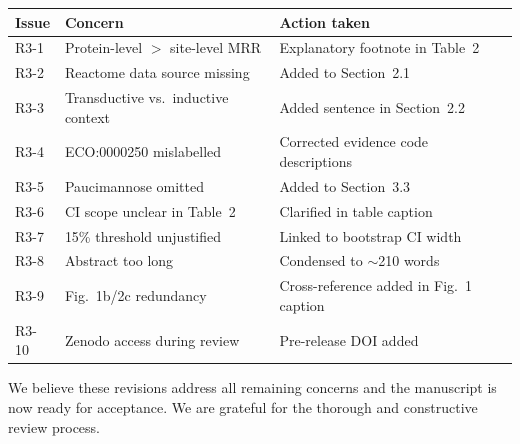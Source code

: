 \documentclass[11pt,a4paper]{article}
\begin{document}
\begin{table}[ht]
\centering
\small
\begin{tabular}{llp{7.5cm}}
\toprule
\textbf{Issue} & \textbf{Concern} & \textbf{Action taken} \\
\midrule
R3-1 & Protein-level $>$ site-level MRR & Explanatory footnote in Table~2 \\
R3-2 & Reactome data source missing & Added to Section~2.1 \\
R3-3 & Transductive vs.\ inductive context & Added sentence in Section~2.2 \\
R3-4 & ECO:0000250 mislabelled & Corrected evidence code descriptions \\
R3-5 & Paucimannose omitted & Added to Section~3.3 \\
R3-6 & CI scope unclear in Table~2 & Clarified in table caption \\
R3-7 & 15\% threshold unjustified & Linked to bootstrap CI width \\
R3-8 & Abstract too long & Condensed to $\sim$210 words \\
R3-9 & Fig.~1b/2c redundancy & Cross-reference added in Fig.~1 caption \\
R3-10 & Zenodo access during review & Pre-release DOI added \\
\bottomrule
\end{tabular}
\end{table}

We believe these revisions address all remaining concerns and the manuscript is
now ready for acceptance. We are grateful for the thorough and constructive
review process.
\end{document}
